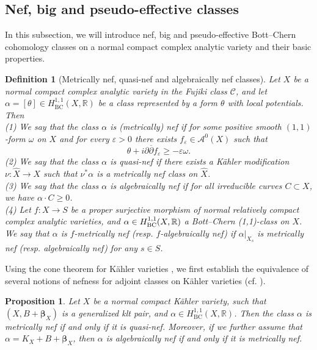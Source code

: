 \documentclass[12pt]{amsart}
\numberwithin{equation}{section}
\newtheorem{proposition}[theorem]{Proposition}
\theoremstyle{definition}
\theoremstyle{plain}
\newtheorem{definition}  [theorem]     {Definition}
\newtheorem*{thm A*}{Theorem A}
\newtheorem*{thm B*}{Theorem B}
\newtheorem*{thm C*}{Theorem C}
\newtheorem*{thm D*}{Theorem D}
\theoremstyle{definition}
\renewcommand{\1}{\mathds{1}}
\renewcommand{\>}{\rightarrow}
\begin{document}
 
\subsection{Nef, big and pseudo-effective classes} In this subsection, we will introduce nef, big and pseudo-effective Bott--Chern cohomology classes on a normal compact complex analytic variety and their basic properties. 

\begin{definition}[Metrically nef, quasi-nef and algebraically nef classes]
Let $X$ be a normal compact complex analytic variety in the Fujiki class $\mathcal{C}$, and let $\alpha = [\theta] \in H_{\mathrm{BC}}^{1,1}(X,\mathbb{R})$ be a class represented by a form $\theta$ with local potentials. Then \\
\emph{(1)} We say that the class $\alpha$ is \emph{(metrically) nef} if for some positive smooth $(1,1)$-form $\omega$ on $X$ and for every $\varepsilon>0$ there exists $f_\varepsilon \in \mathcal{A}^0(X)$ such that $$ \theta+i \partial \overline{\partial} f_\varepsilon \ge-\varepsilon \omega .$$
\emph{(2)} We say that the class $\alpha$ is \emph{quasi-nef} if there exists a K\"ahler modification $\nu \colon \widehat{X} \to X$ such that $\nu^*\alpha$ is a metrically nef class on $\widehat{X}$.\\
\emph{(3)} We say that the class $\alpha$ is \emph{algebraically nef} if for all irreducible curves $C \subset X$, we have  $\alpha\cdot C  \ge 0$.\\
\emph{(4)} Let $f:X\to S$ be a proper surjective morphism of normal relatively compact complex analytic varieties, and  $\alpha \in H^{1,1}_{\rm{BC}}(X,\mathbb{R})$ a Bott--Chern (1,1)-class on $X$. We say that $\alpha$ is \emph{$f$-metrically nef (resp. $f$-algebraically nef)} if $\alpha|_{X_s}$ is metrically nef (resp. algebraically nef) for any $s\in S$.
\end{definition}

Using the cone theorem for K\"ahler varieties \cite{CH20, HP24}, we first establish the equivalence of several notions of nefness for adjoint classes on K\"ahler varieties (cf. \cite[\S\ 2]{Naka86}).


\begin{proposition}\label{nef}
Let $X$ be a normal compact K\"ahler variety, such that $(X, B + \boldsymbol{\beta}_X)$ is a generalized klt pair, and $\alpha \in H^{1,1}_{\mathrm{BC}}(X, \mathbb{R})$. Then the class $\alpha$ is metrically nef if and only if it is quasi-nef. Moreover, if we further assume that $\alpha = K_X + B + \boldsymbol{\beta}_X$, then $\alpha$ is algebraically nef if and only if it is metrically nef.
\end{proposition}
    
\end{document}
